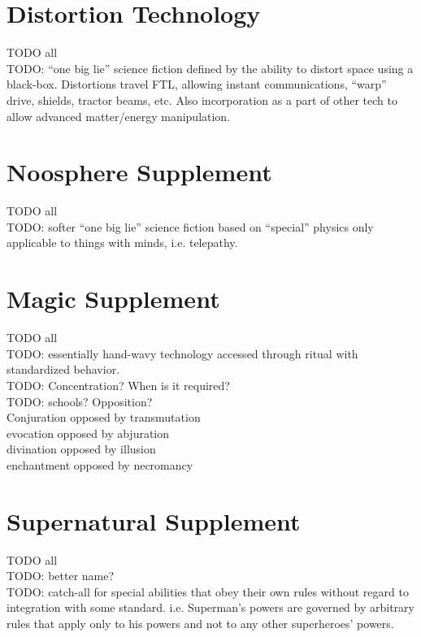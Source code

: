\documentclass[letterpaper,titlepage,openany,twocolumn]{book}
\begin{document}
\chapter{Distortion Technology}
TODO all\\
TODO: “one big lie” science fiction defined by the ability to distort space using a black-box. Distortions travel FTL, allowing instant communications, “warp” drive, shields, tractor beams, etc. Also incorporation as a part of other tech to allow advanced matter/energy manipulation.\\

\chapter{Noosphere Supplement}
TODO all\\
TODO: softer “one big lie” science fiction based on “special” physics only applicable to things with minds, i.e. telepathy.\\

\chapter{Magic Supplement}
TODO all\\
TODO: essentially hand-wavy technology accessed through ritual with standardized behavior.\\
TODO: Concentration? When is it required?\\

TODO: schools? Opposition?\\
	Conjuration	opposed by	transmutation\\
	evocation	opposed by	abjuration\\
	divination	opposed by	illusion\\
	enchantment	opposed by	necromancy\\

\chapter{Supernatural Supplement}
TODO all\\
TODO: better name?\\
TODO: catch-all for special abilities that obey their own rules without regard to integration with some standard. i.e. Superman’s powers are governed by arbitrary rules that apply only to his powers and not to any other superheroes’ powers.\\
\end{document}
